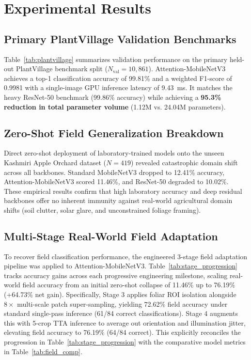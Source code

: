 \documentclass[conference]{IEEEtran}
\begin{document}
\section{Experimental Results}
\label{sec:results}

\subsection{Primary PlantVillage Validation Benchmarks}
Table~\ref{tab:plantvillage} summarizes validation performance on the primary held-out PlantVillage benchmark split ($N_{\text{val}} = 10,861$). \mbox{Attention-MobileNetV3} achieves a top-1 classification accuracy of 99.81\% and a weighted F1-score of 0.9981 with a single-image GPU inference latency of 9.43~ms. It matches the heavy ResNet-50 benchmark (99.86\% accuracy) while achieving a \textbf{95.3\% reduction in total parameter volume} (1.12M vs. 24.04M parameters).

\subsection{Zero-Shot Field Generalization Breakdown}
Direct zero-shot deployment of laboratory-trained models onto the unseen Kashmiri Apple Orchard dataset ($N = 419$) revealed catastrophic domain shift across all backbones. Standard MobileNetV3 dropped to 12.41\% accuracy, Attention-MobileNetV3 scored 11.46\%, and ResNet-50 degraded to 10.02\%. These empirical results confirm that high laboratory accuracy and deep residual backbones offer no inherent immunity against real-world agricultural domain shifts (soil clutter, solar glare, and unconstrained foliage framing).

\subsection{Multi-Stage Real-World Field Adaptation}
To recover field classification performance, the engineered 3-stage field adaptation pipeline was applied to Attention-MobileNetV3. Table~\ref{tab:stage_progression} tracks accuracy gains across each progressive engineering milestone, scaling real-world field accuracy from an initial zero-shot collapse of 11.46\% up to 76.19\% (+64.73\% net gain). Specifically, Stage 3 applies foliar ROI isolation alongside $8\times$ multi-scale patch super-sampling, yielding 72.62\% field accuracy under standard single-pass inference (61/84 correct classifications). Stage 4 augments this with 5-crop TTA inference to average out orientation and illumination jitter, elevating field accuracy to 76.19\% (64/84 correct). This explicitly reconciles the progression in Table~\ref{tab:stage_progression} with the comparative model metrics in Table~\ref{tab:field_comp}.
\end{document}
